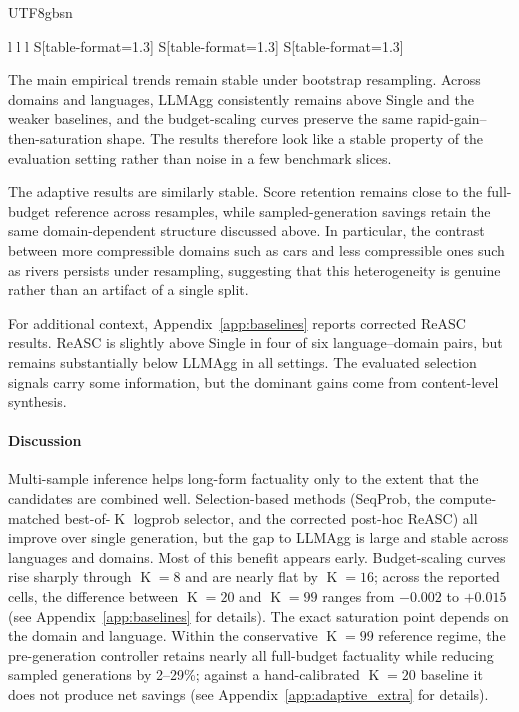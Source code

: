 \documentclass[11pt]{article}
\begin{document}
\begin{CJK*}{UTF8}{gbsn}
\begin{table}[htbp!]
\begin{tabular}{
l l l
S[table-format=1.3]
S[table-format=1.3]
S[table-format=1.3]
}
\bottomrule
\end{tabular}
\caption{Performance by popularity tier (head, torso, tail). $\Delta$ denotes the gain from \textbf{Single} to \textbf{LLMAgg@20}. Point estimates are shown; bootstrap intervals are summarized in the Robustness Analysis paragraph.}
\label{tab:tier_results}
\end{table}

The main empirical trends remain stable under bootstrap resampling. Across domains and languages, LLMAgg consistently remains above Single and the weaker baselines, and the budget-scaling curves preserve the same rapid-gain--then-saturation shape. The results therefore look like a stable property of the evaluation setting rather than noise in a few benchmark slices.

The adaptive results are similarly stable. Score retention remains close to the full-budget reference across resamples, while sampled-generation savings retain the same domain-dependent structure discussed above. In particular, the contrast between more compressible domains such as cars and less compressible ones such as rivers persists under resampling, suggesting that this heterogeneity is genuine rather than an artifact of a single split.

For additional context, Appendix~\ref{app:baselines} reports corrected ReASC~\citep{reasc} results. ReASC is slightly above Single in four of six language--domain pairs, but remains substantially below LLMAgg in all settings. The evaluated selection signals carry some information, but the dominant gains come from content-level synthesis.

\paragraph{Discussion}

Multi-sample inference helps long-form factuality only to the extent that the candidates are combined well. Selection-based methods (SeqProb, the compute-matched best-of-$\operatorname{K}$ logprob selector, and the corrected post-hoc ReASC) all improve over single generation, but the gap to LLMAgg is large and stable across languages and domains. %
%
Most of this benefit appears early. Budget-scaling curves rise sharply through $\operatorname{K}\!=\!8$ and are nearly flat by $\operatorname{K}\!=\!16$; across the reported cells, the difference between $\operatorname{K}\!=\!20$ and $\operatorname{K}\!=\!99$ ranges from $-0.002$ to $+0.015$ (see Appendix~\ref{app:baselines} for details). The exact saturation point depends on the domain and language. Within the conservative $\operatorname{K}\!=\!99$ reference regime, the pre-generation controller retains nearly all full-budget factuality while reducing sampled generations by 2--29\%; against a hand-calibrated $\operatorname{K}\!=\!20$ baseline it does not produce net savings (see Appendix~\ref{app:adaptive_extra} for details).


\end{CJK*}
\end{document}
